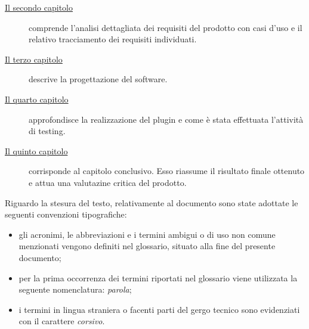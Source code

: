 \begin{description}
    \item[{\hyperref[cap:analisi-requisiti]{Il secondo capitolo}}] comprende l'analisi dettagliata dei requisiti del prodotto con casi d'uso e il relativo tracciamento dei requisiti individuati.

    \item[{\hyperref[cap:progettazione]{Il terzo capitolo}}] descrive la progettazione del software.

    \item[{\hyperref[cap:realizzazione-testing]{Il quarto capitolo}}] approfondisce la realizzazione del plugin e come è stata effettuata l'attività di testing.

    \item[{\hyperref[cap:conclusioni]{Il quinto capitolo}}] corrisponde al capitolo conclusivo. Esso riassume il risultato finale ottenuto e attua una valutazine critica del prodotto.

\end{description}

Riguardo la stesura del testo, relativamente al documento sono state adottate le seguenti convenzioni tipografiche:
\begin{itemize}
	\item gli acronimi, le abbreviazioni e i termini ambigui o di uso non comune menzionati vengono definiti nel glossario, situato alla fine del presente documento;
	\item per la prima occorrenza dei termini riportati nel glossario viene utilizzata la seguente nomenclatura: \emph{parola}\glsfirstoccur;
	\item i termini in lingua straniera o facenti parti del gergo tecnico sono evidenziati con il carattere \emph{corsivo}.
\end{itemize}